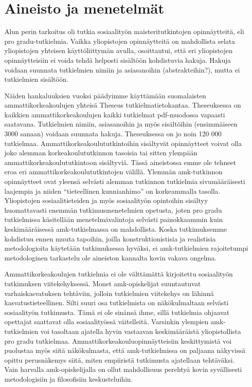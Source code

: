 
\section*{Aineisto ja menetelmät}

Alun perin tarkoitus oli tutkia sosiaalityön maisteritutkintojen
opinnäytteitä, eli pro gradu-tutkielmia. Vaikka yliopistojen
opinnäytteitä on mahdollista selata yliopistojen yhteisen
käyttöliittymän avulla,
osoittautui, että eri yliopistojen opinnäytteisiin ei voida tehdä
helposti sisältöön kohdistuvia hakuja. Hakuja voidaan suunnata
tutkielmien nimiin ja asiasanoihin (abstrakteihin?), mutta ei
tutkielmien sisältöön.

Näiden hankaluuksien vuoksi päädyimme käyttämään suomalaisten
ammattikorkeakoulujen yhteisä Theseus tutkielmatietokantaa. Theseuksessa
on kaikkien ammattikorkeakoulujen kaikki tutkielmat pdf-muodossa
vapaasti saatavana. Tutkielmien nimiin, asiasanoihin ja myös sisältöihin
(ensimmäiseen 3000 sanaan) voidaan suunnata hakuja. Theseuksessa on jo
noin 120 000 tutkielmaa. Ammattikorkeakoulututkintoihin sisältyvät
opinnäytteet voivat olla joko alemman korkeakoulututkinnon tasoisia tai
sitten ylempään ammattikorkeakoulututkintoon sisältyviä. Tässä
aineistossa emme ole tehneet eroa eri ammattikorkeakoulututkintojen
välillä. Ylemmän amk-tutkinnon opinnäytteet ovat yleensä selvästi
alemman tutkinnon tutkielmia sivumääräisesti laajempia ja niiden
``tieteellinen kunnianhimo'' on korkeammalla tasolla. Yliopistojen
sosiaalitieteiden ja myös sosiaalityön opintoihin sisältyy huomattavasti
enemmän tutkimusmenetelmien opetusta, joten pro gradu tutkielmissa
käsitellään menetelmävalintoja selvästi painokkaammin kuin
keskimääräisessä amk-tutkielmassa on mahdollista. Koska tutkimuksemme
kohdistuu ennen muuta tapoihin, joilla konstruktionistisia ja
realistisia metodologioita käytetään tutkimuksessa hyväksi, ei
amk-tutkielmien rajoitetumpi metodologinen tarkastelu ole aineiston
kannalta kovin vakava ongelma.

Ammattikorkeakoulujen tutkielmia ei ole välttämättä kirjoitettu
sosiaalityön tutkimuksen viitekehyksessä. Monet amk-opiskelijat
suuntautuvat varhaiskasvatuksen tehtäviin, jolloin tutkielmien
viitekehys on lähinnä kasvatustieteellinen. Silti suuri osa tutkielmista
on näkökulmaltaan selvästi sosiaalityön tutkimusta. Tämä ei ole sinänsä
ihme, sillä tutkielmia ohjaavat opettajat saattavat olla sosiaalityössä
väitelleitä. Varsinkin ylempien amk-tutkielmien voi tasoltaan ajatella
hyvin vastaavan keskimääräistä yliopistollista pro gradu tutkielmaa.
Ammattikorkeakouluopinnäytteisiin keskittymistä voi puolustaa myös siitä
näkökulmasta, että amk-tutkielmissa on paljaana näkyvissä opittu
perusnäkemys siitä, miten empiiristä tutkimusta ajatellaan tehtäväksi.
Vain harvalla amk-opiskelijalla on ollut mahdollisuus perehtyä kovin
syvällisesti metodologisiin ja filosofisiin keskusteluihin.

